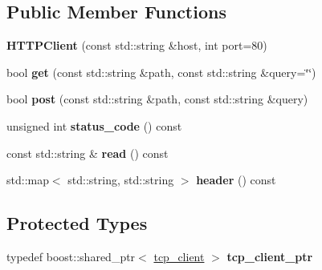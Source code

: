 \subsection*{Public Member Functions}
\begin{DoxyCompactItemize}
\item 
\hypertarget{classskl_1_1_h_t_t_p_client_aa51f43aef6208916f62669de3fed1de0}{}\label{classskl_1_1_h_t_t_p_client_aa51f43aef6208916f62669de3fed1de0} 
{\bfseries H\+T\+T\+P\+Client} (const std\+::string \&host, int port=80)
\item 
\hypertarget{classskl_1_1_h_t_t_p_client_adea8587355607c4fdde6e6c85d445fc9}{}\label{classskl_1_1_h_t_t_p_client_adea8587355607c4fdde6e6c85d445fc9} 
bool {\bfseries get} (const std\+::string \&path, const std\+::string \&query=\char`\"{}\char`\"{})
\item 
\hypertarget{classskl_1_1_h_t_t_p_client_af319583a773165209adc257bd7a3cef9}{}\label{classskl_1_1_h_t_t_p_client_af319583a773165209adc257bd7a3cef9} 
bool {\bfseries post} (const std\+::string \&path, const std\+::string \&query)
\item 
\hypertarget{classskl_1_1_h_t_t_p_client_a3727336ba1c411c3d10949f31a987c27}{}\label{classskl_1_1_h_t_t_p_client_a3727336ba1c411c3d10949f31a987c27} 
unsigned int {\bfseries status\+\_\+code} () const
\item 
\hypertarget{classskl_1_1_h_t_t_p_client_a8ce4445d43ff331ed51cce35d66a95c6}{}\label{classskl_1_1_h_t_t_p_client_a8ce4445d43ff331ed51cce35d66a95c6} 
const std\+::string \& {\bfseries read} () const
\item 
\hypertarget{classskl_1_1_h_t_t_p_client_a1679219321139d2306e101d251de73c4}{}\label{classskl_1_1_h_t_t_p_client_a1679219321139d2306e101d251de73c4} 
std\+::map$<$ std\+::string, std\+::string $>$ {\bfseries header} () const
\end{DoxyCompactItemize}
\subsection*{Protected Types}
\begin{DoxyCompactItemize}
\item 
\hypertarget{classskl_1_1_h_t_t_p_client_a7911f896b7d883ac33814684deb03dfa}{}\label{classskl_1_1_h_t_t_p_client_a7911f896b7d883ac33814684deb03dfa} 
typedef boost\+::shared\+\_\+ptr$<$ \hyperlink{classskl_1_1_h_t_t_p_client_1_1tcp__client}{tcp\+\_\+client} $>$ {\bfseries tcp\+\_\+client\+\_\+ptr}
\end{DoxyCompactItemize}
